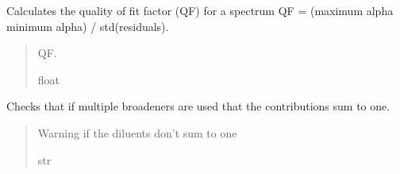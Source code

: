 \documentclass[letterpaper,10pt,english]{sphinxmanual}
\begin{document}
\begin{fulllineitems}
\begin{quote}
\begin{description}
\begin{itemize}
\end{itemize}

\end{description}\end{quote}

\begin{fulllineitems}
\label{\detokenize{MATS:MATS.spectrum.Spectrum.calculate_QF}}
\pysigstartsignatures
{}
\pysigstopsignatures
\sphinxAtStartPar
Calculates the quality of fit factor (QF) for a spectrum \sphinxhyphen{} QF = (maximum alpha \sphinxhyphen{} minimum alpha) / std(residuals).
\begin{quote}\begin{description}
\sphinxAtStartPar
QF.

\sphinxAtStartPar
float

\end{description}\end{quote}

\end{fulllineitems}


\begin{fulllineitems}
\label{\detokenize{MATS:MATS.spectrum.Spectrum.diluent_sum_check}}
\pysigstartsignatures
{}
\pysigstopsignatures
\sphinxAtStartPar
Checks that if multiple broadeners are used that the contributions sum to one.
\begin{quote}\begin{description}
\sphinxAtStartPar
Warning if the diluents don’t sum to one

\sphinxAtStartPar
str

\end{description}\end{quote}

\end{fulllineitems}



\end{fulllineitems}
\end{document}
